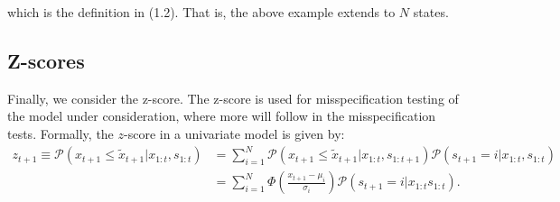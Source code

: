 \documentclass[11pt,a4paper,oneside]{article}
\newcommand{\lp}{\left(}
\newcommand{\rp}{\right)}
\newcommand{\pp}{\mathcal{P}}
\begin{document}
which is the definition in (1.2). That is, the above example extends to $N$ states.

\subsection{Z-scores}
Finally, we consider the z-score. The z-score is used for misspecification testing of the model under consideration, where more will follow in the misspecification tests. Formally, the $z$-score in a univariate model is given by:
\begin{align}
    z_{t+1} \equiv \pp \lp x_{t+1} \leq \tilde x_{t+1} \vert x_{1:t}, s_{1:t}\rp 
        &= \sum_{i=1}^N\pp\lp x_{t+1}\leq \tilde x_{t+1} \vert x_{1:t}, s_{1:t+1} \rp \pp\lp s_{t+1} = i\vert x_{1:t}, s_{1:t}\rp \\
        &= \sum_{i = 1}^N \Phi \lp \frac{x_{t+1} - \mu_i }{\sigma_i}\rp \pp\lp s_{t+1} = i\vert x_{1:t}s_{1:t}\rp.
\end{align}
\end{document}
